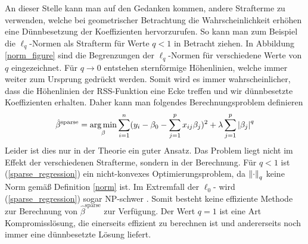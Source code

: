 An dieser Stelle kann man auf den Gedanken kommen, andere Strafterme zu verwenden, welche bei geometrischer Betrachtung die Wahrscheinlichkeit erhöhen eine Dünnbesetzung der Koeffizienten hervorzurufen. So kann man zum Beispiel die $\ell_q$-Normen als Strafterm für Werte $q < 1$ in Betracht ziehen. In Abbildung \ref{norm_figure} sind die Begrenzungen der $\ell_q$-Normen für verschiedene Werte von $q$ eingezeichnet. Für $q \rightarrow 0$ entstehen sternförmige Höhenlinien, welche immer weiter zum Ursprung gedrückt werden. Somit wird es immer wahrscheinlicher, dass die Höhenlinien der RSS-Funktion eine Ecke treffen und wir dünnbesetzte Koeffizienten erhalten. Daher kann man folgendes Berechnungsproblem definieren
\begin{align}
\label{sparse_regression}
\hat{\beta}^{\text{sparse}} = \operatorname*{arg\,min}_{\beta} \sum_{i=1}^{n}(y_i - \beta_0 - \sum_{j=1}^p x_{ij}\beta_j)^2 + \lambda\sum_{j=1}^p \left|\beta_j\right|^q
\end{align}
Leider ist dies nur in der Theorie ein guter Ansatz. Das Problem liegt nicht im Effekt der verschiedenen Strafterme, sondern in der Berechnung. Für $q < 1$ ist (\ref{sparse_regression}) ein nicht-konvexes Optimierungsproblem, da $\left\lVert \cdot \right\rVert_q$ keine Norm gemäß Definition \ref{norm} ist. Im Extremfall der $\ell_0$- wird (\ref{sparse_regression}) sogar NP-schwer \cite{foucart}. Somit besteht keine effiziente Methode zur Berechnung von $\hat{\beta}^{\text{sparse}}$ zur Verfügung. Der Wert $q = 1$ ist eine Art Kompromisslösung, die einerseits effizient zu berechnen ist und andererseits noch immer eine dünnbesetzte Lösung liefert.

